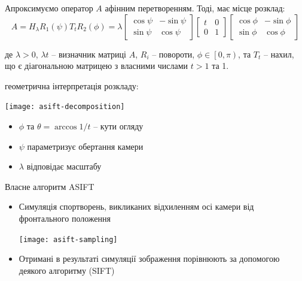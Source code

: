 \documentclass{beamer}
\begin{document}
\begin{frame}
  Апроксимуємо оператор $A$ афінним перетворенням. Тоді, має місце розклад:
  \begin{equation}
    \label{eq:asift-decomposition}
    A = H_\lambda R_1(\psi)T_tR_2(\phi) =     
    \lambda \begin{bmatrix} 
      \cos \psi & -\sin\psi \\
      \sin\psi  & \cos\psi
    \end{bmatrix}
    \begin{bmatrix}
      t & 0 \\
      0 & 1 
    \end{bmatrix}
    \begin{bmatrix} 
      \cos \phi & -\sin\phi \\
      \sin\phi  & \cos\phi
    \end{bmatrix}
  \end{equation}

  де $\lambda>0$, $\lambda t$ -- визначник матриці $A$, $R_i$ -- повороти, $\phi \in \left[0,\pi\right)$, та $T_t$ -- нахил, що є діагональною матрицею з власними числами $t>1$ та 1.

  геометрична інтерпретація розкладу:
  \begin{center}\texttt{[image: asift-decomposition]}\end{center}
  \begin{itemize}
    \item $\phi$ та $\theta= \arccos1/t$ -- кути огляду
    \item $\psi$ параметризує обертання камери
    \item $\lambda$ відповідає масштабу
  \end{itemize}

\end{frame}

\begin{frame}{Власне алгоритм ASIFT}
  \begin{itemize}
    \item Симуляція спортворень, викликаних відхиленням осі камери від фронтального положення
    \begin{center}\texttt{[image: asift-sampling]}\end{center}
    \item Отримані в результаті симуляції зображення порівнюють за допомогою деякого алгоритму (SIFT)
  \end{itemize}
\end{frame}
\end{document}

